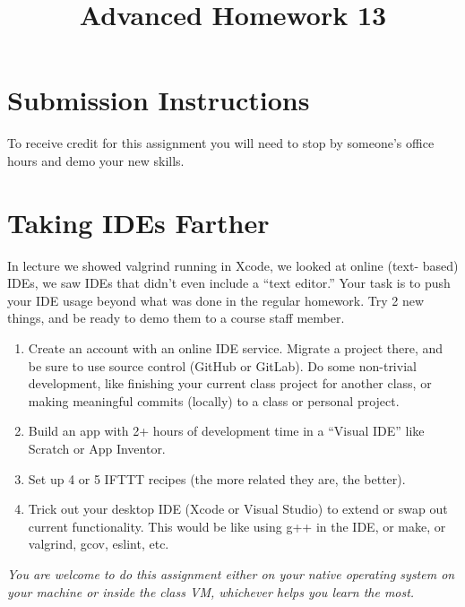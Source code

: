 \documentclass{article}
\begin{document}
\fancyfoot[C]{\color{gray} \thepage~/~\pageref*{LastPage}}
\pagestyle{fancyplain}


\title{\textbf{Advanced Homework 13}}
\author{\textbf{\color{red}{Due: Saturday, April 15 10:00PM (Hard Deadline)}}}
\date{}
\maketitle


\section*{Submission Instructions}
To receive credit for this assignment you will need to stop by someone's
office hours and demo your new skills.

\section*{Taking IDEs Farther}
In lecture we showed valgrind running in Xcode, we looked at online (text-
based) IDEs, we saw IDEs that didn't even include a ``text editor.'' Your task
is to push your IDE usage beyond what was done in the regular homework. Try
2 new things, and be ready to demo them to a course staff member.

\begin{enumerate}
\item Create an account with an online IDE service. Migrate a project there,
      and be sure to use source control (GitHub or GitLab). Do some non-trivial
      development, like finishing your current class project for another class,
      or making meaningful commits (locally) to a class or personal project.
\item Build an app with 2+ hours of development time in a ``Visual IDE'' like
      Scratch or App Inventor.
\item Set up 4 or 5 IFTTT recipes (the more related they are, the better).
\item Trick out your desktop IDE (Xcode or Visual Studio) to extend or swap out
      current functionality. This would be like using g++ in the IDE, or make,
      or valgrind, gcov, eslint, etc.
\end{enumerate}

\emph{You are welcome to do this assignment either on your native operating
  system on your machine or inside the class VM, whichever helps you learn the
  most.}
\end{document}
